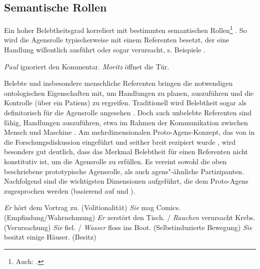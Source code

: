 \subsection{Semantische Rollen}\label{sec:partizipanten}

Ein hoher Belebtheitsgrad korreliert mit bestimmten semantischen Rollen\footnote{Auch:  \parencite[vgl.][]{Lehmann2004a}.} \parencite[vgl. u.a.][]{Hopper1980,Comrie1989,Yamamoto2006}. So wird die Agensrolle typischerweise mit einem Referenten besetzt, der eine Handlung willentlich ausführt oder sogar verursacht, s. Beispiele .

\begin{exe}
	\ex \label{ex:agens}
	\begin{xlist}
		\ex \label{ex:voll} \textit{Paul} ignoriert den Kommentar. 
 		\ex \label{ex:verursacher} \textit{Moritz} öffnet die Tür.
	\end{xlist}
\end{exe}

\noindent 
Belebte und insbesondere menschliche Referenten bringen die notwendigen ontologischen Eigenschaften mit, um Handlungen zu planen,  auszuführen und die Kontrolle (über ein Patiens) zu ergreifen. Traditionell wird Belebtheit sogar als definitorisch für die Agensrolle angesehen \parencite[16]{Primus2012}. 
Doch auch unbelebte Referenten sind fähig, Handlungen auszuführen, etwa im Rahmen der  Kommunikation zwischen Mensch und Maschine \parencite[s. weiterführend][18]{Primus2012}. Am mehrdimensionalen Proto-Agens-Konzept, das von \textcite{Dowty1991} in die Forschungsdiskussion eingeführt und seither breit rezipiert wurde \parencite[vgl. u.a.][]{Ackermann2001,Primus2012,Szczepaniak2016}, wird besonders gut deutlich, dass das Merkmal Belebtheit für einen Referenten nicht konstitutiv ist, um die Agensrolle zu erfüllen. Es vereint sowohl die oben beschriebene prototypische Agensrolle, als auch agens"-ähnliche Partizipanten. Nachfolgend sind die wichtigsten Dimensionen aufgeführt, die dem Proto-Agens zugesprochen werden  (basierend auf \citealt[572--573]{Dowty1991} und \citealt[25]{Primus2012}).  

\begin{exe}
\ex \label{ex:proto-agens}
	\begin{xlist}
        \ex  \textit{Er} hört dem Vortrag zu. (Volitionalität)
        \ex  \textit{Sie} mag Comics. (Empfindung/Wahrnehmung)
        \ex \textit{Er} zerstört den Tisch. / \textit{Rauchen} verursacht Krebs. (Verursachung)
        \ex  \textit{Sie} fiel. / \textit{Wasser} floss ins Boot. (Selbstinduzierte Bewegung)
        \ex  \textit{Sie} besitzt einige Häuser. (Besitz)
	\end{xlist}
\end{exe}

